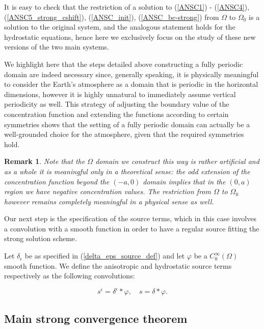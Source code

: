 \documentclass[11pt, a4paper]{article}
\newtheorem{remark}{Remark}
\begin{document}
It is easy to check that the restriction of a solution to (\ref{ANSC1}) - (\ref{ANSC4}), (\ref{ANSC5_strong_cshift}), (\ref{ANSC_init}), (\ref{ANSC_bc-strong}) from $\Omega$ to $\Omega_0$ is a solution to the original system, and the analogous statement holds for the hydrostatic equations, hence here we exclusively focus on the study of these new versions of the two main systems.

We highlight here that the steps detailed above constructing a fully periodic domain are indeed necessary since, generally speaking, it is physically meaningful to consider the Earth's atmosphere as a domain that is periodic in the horizontal dimensions, however it is highly unnatural to immediately assume vertical periodicity as well. This strategy of adjusting the boundary value of the concentration function and extending the functions according to certain symmetries shows that the setting of a fully periodic domain can actually be a well-grounded choice for the atmosphere, given that the required symmetries hold.

\begin{remark}
\normalfont Note that the $\Omega$ domain we construct this way is rather artificial and as a whole it is meaningful only in a theoretical sense: the odd extension of the concentration function beyond the $(-a, 0)$ domain implies that in the $(0,a)$ region we have negative concentration values. The restriction from $\Omega$ to $\Omega_0$ however remains completely meaningful in a physical sense as well.
\end{remark}

Our next step is the specification of the source terms, which in this case involves a convolution with a smooth function in order to have a regular source fitting the strong solution scheme.

Let $\delta_\epsilon$ be as specified in (\ref{delta_eps_source_def}) and let $\varphi$ be a $C^\infty_0 (\Omega)$ smooth function. We define the anisotropic and hydrostatic source terms respectively as the following convolutions:

\begin{equation} \label{sourcetermdefinitionstrong} s^\epsilon = \delta^\epsilon \ast \varphi, \quad s = \delta \ast \varphi.\end{equation}

\subsection{Main strong convergence theorem}
\end{document}
